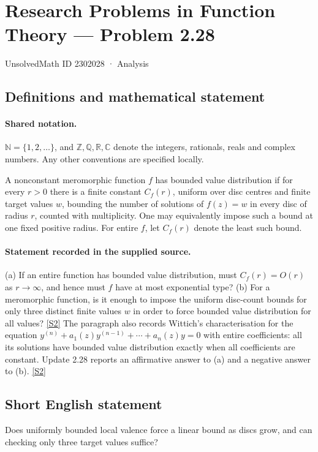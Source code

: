 \documentclass[11pt]{article}
\newcommand{\sref}[2]{\hyperlink{source:#1:#2}{[S#2]}}
\begin{document}
\setcounter{section}{2302027}
\section{Research Problems in Function Theory — Problem 2.28}\label{2302028}
{\small\sffamily UnsolvedMath ID 2302028 · Analysis}
\subsection{Definitions and mathematical statement}

\paragraph{Shared notation.}$\mathbb N=\{1,2,\ldots\}$, and $\mathbb Z,\mathbb Q,\mathbb R,\mathbb C$ denote the integers, rationals, reals and complex numbers. Any other conventions are specified locally.


A nonconstant meromorphic function $f$ has bounded value distribution if for every $r>0$ there is a finite constant $C_f(r)$, uniform over disc centres and finite target values $w$, bounding the number of solutions of $f(z)=w$ in every disc of radius $r$, counted with multiplicity. One may equivalently impose such a bound at one fixed positive radius.
For entire $f$, let $C_f(r)$ denote the least such bound.

\paragraph{Statement recorded in the supplied source.}
(a) If an entire function has bounded value distribution, must $C_f(r)=O(r)$ as $r\to\infty$, and hence must $f$ have at most exponential type?
(b) For a meromorphic function, is it enough to impose the uniform disc-count bounds for only three distinct finite values $w$ in order to force bounded value distribution for all values? \sref{2302028}{2}
The paragraph also records Wittich's characterisation for the equation $y^{(n)}+a_1(z)y^{(n-1)}+\cdots+a_n(z)y=0$ with entire coefficients: all its solutions have bounded value distribution exactly when all coefficients are constant. Update 2.28 reports an affirmative answer to (a) and a negative answer to (b). \sref{2302028}{2}
\subsection{Short English statement}
Does uniformly bounded local valence force a linear bound as discs grow, and can checking only three target values suffice?
\end{document}
